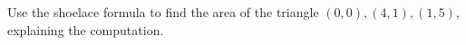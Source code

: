 Use the shoelace formula to find the area of the triangle $(0,0),(4,1),(1,5)$, explaining the computation.
